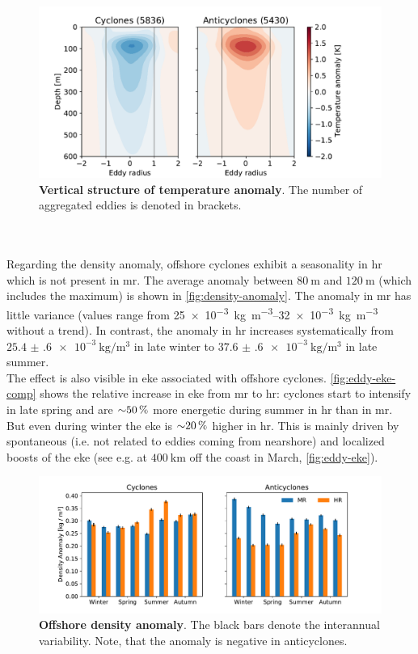 \begin{figure}
    \centering
    \hspace*{1cm}\includegraphics[width=12cm, trim=0 0 1cm 0]{../figures/result_composites_temp.pdf}
    \caption[Vertical structure of temperature anomaly]{\textbf{Vertical structure of temperature anomaly}. The number of aggregated eddies is denoted in brackets.}\label{fig:eddy-temp}
\end{figure}
\\
\\
Regarding the density anomaly, offshore cyclones exhibit a seasonality in \ac{hr} which is not present in \ac{mr}. The average anomaly between $\SI{80}{\metre}$ and $\SI{120}{\metre}$ (which includes the maximum) is shown in \autoref{fig:density-anomaly}. The anomaly in \ac{mr} has little variance (values range from \SIrange{25e-3}{32e-3}{\kilo\gram\per\metre\cubed} without a trend). In contrast, the anomaly in \ac{hr} increases systematically from $\SI{25.4(6)e-3}{\kilo\gram\per\metre\cubed}$ in late winter to $\SI{37.6(6)e-3}{\kilo\gram\per\metre\cubed}$ in late summer.\\
The effect is also visible in \ac{eke} associated with offshore cyclones. \autoref{fig:eddy-eke-comp} shows the relative increase in \ac{eke} from \ac{mr} to \ac{hr}: cyclones start to intensify in late spring and are ${\sim} \SI{50}{\percent}$ more energetic during summer in \ac{hr} than in \ac{mr}. But even during winter the \ac{eke} is ${\sim} \SI{20}{\percent}$ higher in \ac{hr}. This is mainly driven by spontaneous (i.e. not related to eddies coming from nearshore) and localized boosts of the \ac{eke} (see e.g. at $\SI{400}{\kilo\metre}$ off the coast in March, \autoref{fig:eddy-eke}).\\
\begin{figure}
    \centering
    \hspace*{-0.2cm}\includegraphics[width=16cm, trim=0 0 0 0]{../figures/result_eddies_density}
    \caption[Offshore density anomaly]{\textbf{Offshore density anomaly}. The black bars denote the interannual variability. Note, that the anomaly is negative in anticyclones.}\label{fig:density-anomaly}
\end{figure}
